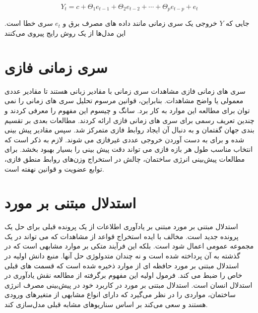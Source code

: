    \begin{equation}\label{eq:q}
        Y_t = c + \Theta_1 e_{t-1} + \Theta_2 e_{t-2} + \cdots + \Theta_p e_{t-p} + e_t
    \end{equation}

    جایی که $Y$ خروجی یک سری زمانی مانند داده های مصرف برق و $e_t$ سری خطا است. این مدل‌ها از یک روش رایج پیروی می‌کنند
\section{سری زمانی فازی}
سری های زمانی فازی مشاهدات سری زمانی با مقادیر زبانی هستند تا مقادیر عددی معمولی یا واضح مشاهدات.
 بنابراین، قوانین مرسوم تحلیل سری های زمانی را نمی توان برای مطالعه این موارد به کار برد. سانگ و چیسوم \cite{song1993fuzzy} این مفهوم را معرفی کردند و چندین تعریف رسمی برای سری های زمانی فازی ارائه کردند. 
 مطالعات بعدی بر تقسیم بندی جهان گفتمان و به دنبال آن ایجاد روابط فازی متمرکز شد. سپس مقادیر پیش بینی شده و برای به دست آوردن خروجی عددی غیرفازی می شوند. 
 لازم به ذکر است که انتخاب مناسب طول هر بازه فازی می تواند دقت پیش بینی را بسیار بهبود بخشد.
  برای مطالعات پیش‌بینی انرژی ساختمان، چالش در استخراج وزن‌های روابط منطق فازی، توابع عضویت و قوانین نهفته است.

\section{استدلال مبتنی بر مورد\protect{}}
استدلال مبتنی بر مورد مبتنی بر یادآوری اطلاعات از یک پرونده قبلی برای حل یک پرونده جدید است. مخالف با ایده استخراج قواعد از مشاهدات که می تواند در یک مجموعه عمومی اعمال شود است.
 بلکه این فرآیند متکی بر موارد مشابهی است 
 که در گذشته به آن پرداخته شده است و نه چندان متدولوژی حل آنها.
  منبع دانش اولیه در استدلال مبتنی بر مورد حافظه ای از موارد ذخیره شده است که قسمت های قبلی خاص را ضبط می کند\cite{leake1996cbr}. 
 فرمول اولیه این مفهوم برگرفته از مطالعه نقش یادآوری در استدلال انسان است\cite{schank1983dynamic}. 
 استدلال مبتنی بر مورد در کاربرد خود در پیش‌بینی مصرف انرژی ساختمان، مواردی را در نظر می‌گیرد که دارای انواع مشابهی از متغیرهای ورودی هستند
  و سعی می‌کند بر اساس سناریوهای مشابه قبلی مدل‌سازی کند.

